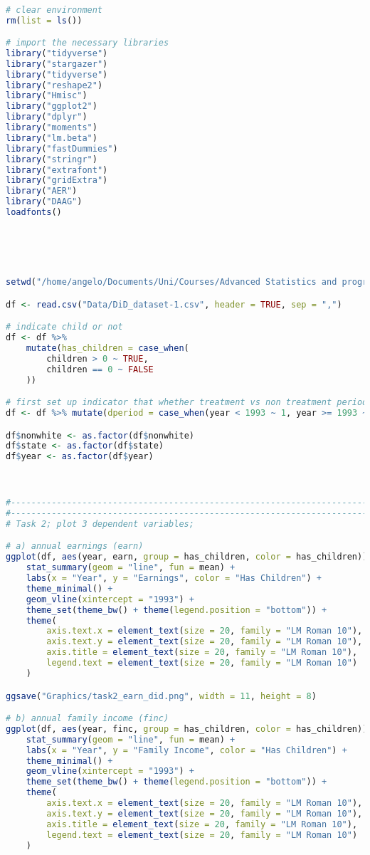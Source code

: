 \documentclass[a4paper]{article}
\begin{document}
\begin{lstlisting}[language=R]

# clear environment
rm(list = ls())

# import the necessary libraries
library("tidyverse")
library("stargazer")
library("tidyverse")
library("reshape2")
library("Hmisc")
library("ggplot2")
library("dplyr")
library("moments")
library("lm.beta")
library("fastDummies")
library("stringr")
library("extrafont")
library("gridExtra")
library("AER")
library("DAAG")
loadfonts()





setwd("/home/angelo/Documents/Uni/Courses/Advanced Statistics and programming/Assignments/assignment2")

df <- read.csv("Data/DiD_dataset-1.csv", header = TRUE, sep = ",")

# indicate child or not
df <- df %>%
    mutate(has_children = case_when(
        children > 0 ~ TRUE,
        children == 0 ~ FALSE
    ))

# first set up indicator that whether treatment vs non treatment period
df <- df %>% mutate(dperiod = case_when(year < 1993 ~ 1, year >= 1993 ~ 2))

df$nonwhite <- as.factor(df$nonwhite)
df$state <- as.factor(df$state)
df$year <- as.factor(df$year)



#---------------------------------------------------------------------------------------
#---------------------------------------------------------------------------------------
# Task 2; plot 3 dependent variables;

# a) annual earnings (earn)
ggplot(df, aes(year, earn, group = has_children, color = has_children)) +
    stat_summary(geom = "line", fun = mean) +
    labs(x = "Year", y = "Earnings", color = "Has Children") +
    theme_minimal() +
    geom_vline(xintercept = "1993") +
    theme_set(theme_bw() + theme(legend.position = "bottom")) +
    theme(
        axis.text.x = element_text(size = 20, family = "LM Roman 10"),
        axis.text.y = element_text(size = 20, family = "LM Roman 10"),
        axis.title = element_text(size = 20, family = "LM Roman 10"),
        legend.text = element_text(size = 20, family = "LM Roman 10")
    )

ggsave("Graphics/task2_earn_did.png", width = 11, height = 8)

# b) annual family income (finc)
ggplot(df, aes(year, finc, group = has_children, color = has_children)) +
    stat_summary(geom = "line", fun = mean) +
    labs(x = "Year", y = "Family Income", color = "Has Children") +
    theme_minimal() +
    geom_vline(xintercept = "1993") +
    theme_set(theme_bw() + theme(legend.position = "bottom")) +
    theme(
        axis.text.x = element_text(size = 20, family = "LM Roman 10"),
        axis.text.y = element_text(size = 20, family = "LM Roman 10"),
        axis.title = element_text(size = 20, family = "LM Roman 10"),
        legend.text = element_text(size = 20, family = "LM Roman 10")
    )


\end{lstlisting}
\end{document}
